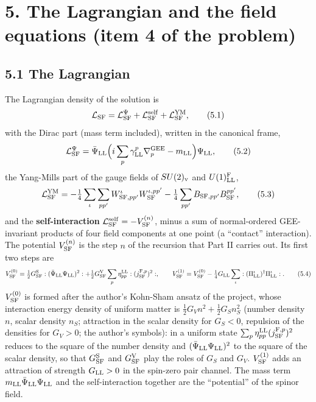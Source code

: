 \documentclass[
  10pt,
]{article}
\begin{document}
\hypertarget{the-lagrangian-and-the-field-equations-item-4-of-the-problem}{%
\section{5. The Lagrangian and the field equations (item 4 of the
problem)}\label{the-lagrangian-and-the-field-equations-item-4-of-the-problem}}

\hypertarget{the-lagrangian}{%
\subsection{5.1 The Lagrangian}\label{the-lagrangian}}

The Lagrangian density of the solution is
\[\mathcal L_{\rm SF}=\mathcal L^\Psi_{\rm SF}+\mathcal L^{\rm self}_{\rm SF}+\mathcal L^{\rm YM}_{\rm SF},\tag{5.1}\]
with the Dirac part (mass term included), written in the canonical
frame,
\[\mathcal L^\Psi_{\rm SF}=\bar\Psi_{\rm LL}\Big(i\sum_p\gamma^p_{\rm LL}\nabla^{\rm GEE}_p-m_{\rm LL}\Big)\Psi_{\rm LL},\tag{5.2}\]
the Yang-Mills part of the gauge fields of \(SU(2)_{\rm v}\) and
\(U(1)^{\rm F}_{\rm LL}\),
\[\mathcal L^{\rm YM}_{\rm SF}=-\tfrac14\sum_{\iota}\sum_{pp'}W^\iota_{{\rm SF},pp'}W^{\iota,pp'}_{\rm SF}-\tfrac14\sum_{pp'}B_{{\rm SF},pp'}B^{pp'}_{\rm SF},\tag{5.3}\]
and the \textbf{self-interaction}
\(\mathcal L^{\rm self}_{\rm SF}=-V^{(n)}_{\rm SF}\), minus a sum of
normal-ordered GEE-invariant products of four field components at one
point (a ``contact'' interaction). The potential \(V^{(n)}_{\rm SF}\) is
the step \(n\) of the recursion that Part II carries out. Its first two
steps are
\[V^{(0)}_{\rm SF}=\tfrac12G^{\rm S}_{\rm SF}:(\bar\Psi_{\rm LL}\Psi_{\rm LL})^2:+\tfrac12G^{\rm V}_{\rm SF}\sum_p\eta^{\rm LL}_{pp}:(j^{{\rm F},p}_{\rm SF})^2:,\qquad V^{(1)}_{\rm SF}=V^{(0)}_{\rm SF}-\tfrac14G_{\rm LL}\sum_\iota:(\Pi^\iota_{\rm LL})^\dagger\Pi^\iota_{\rm LL}:.\tag{5.4}\]
\(V^{(0)}_{\rm SF}\) is formed after the author's Kohn-Sham ansatz of
the project, whose interaction energy density of uniform matter is
\(\tfrac12G_Vn^2+\tfrac12G_Sn_S^2\) (number density \(n\), scalar
density \(n_S\); attraction in the scalar density for \(G_S<0\),
repulsion of the densities for \(G_V>0\); the author's symbols): in a
uniform state \(\sum_p\eta^{\rm LL}_{pp}(j^{{\rm F},p}_{\rm SF})^2\)
reduces to the square of the number density and
\((\bar\Psi_{\rm LL}\Psi_{\rm LL})^2\) to the square of the scalar
density, so that \(G^{\rm S}_{\rm SF}\) and \(G^{\rm V}_{\rm SF}\) play
the roles of \(G_S\) and \(G_V\). \(V^{(1)}_{\rm SF}\) adds an
attraction of strength \(G_{\rm LL}>0\) in the spin-zero pair channel.
The mass term \(m_{\rm LL}\bar\Psi_{\rm LL}\Psi_{\rm LL}\) and the
self-interaction together are the ``potential'' of the spinor field.
\end{document}
